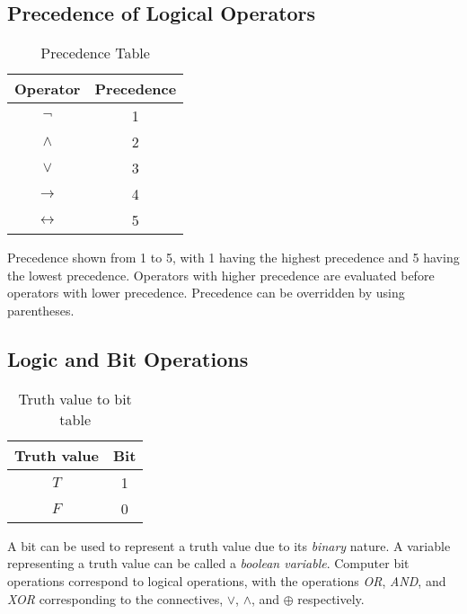 \documentclass[12pt letter]{report}
\begin{document}
\subsection{Precedence of Logical Operators}

\begin{table}[h!]
  \caption{Precedence Table}\label{tab:prec}
  \begin{center}
    \begin{tabular}{|c|c|}
      \hline
      Operator          & Precedence \\ [0.5ex]
      \hline
      \hline
      $\neg$            & 1          \\
      $\wedge$          & 2          \\
      $\vee$            & 3          \\
      $\to$             & 4          \\
      $\leftrightarrow$ & 5          \\
      \hline
    \end{tabular}
  \end{center}
\end{table}

Precedence shown from 1 to 5, with 1 having the highest precedence and 5 having the lowest precedence. Operators with
higher precedence are evaluated before operators with lower precedence. Precedence can be overridden by using parentheses.

\subsection{Logic and Bit Operations}


\begin{table}[h!]
  \caption{Truth value to bit table}\label{tab:bit}
  \begin{center}
    \begin{tabular}{|c|c|}
      \hline
      Truth value & Bit \\ [0.5ex]
      \hline
      \hline
      $T$         & 1   \\
      $F$         & 0   \\
      \hline
    \end{tabular}
  \end{center}
\end{table}

A bit can be used to represent a truth value due to its \textit{binary} nature. A variable representing a truth value
can be called a \textit{boolean variable}. Computer bit operations correspond to logical operations, with the operations
\textit{OR}, \textit{AND}, and \textit{XOR} corresponding to the connectives, $\vee$, $\wedge$, and $\oplus$ respectively.
\end{document}
